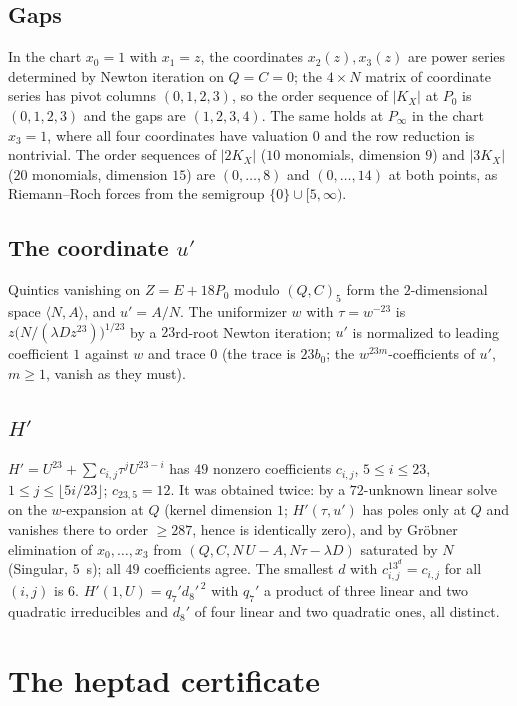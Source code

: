 \documentclass[11pt]{amsart}
\theoremstyle{plain}
\theoremstyle{definition}
\begin{document}
\subsection*{Gaps}
In the chart $x_0=1$ with $x_1=z$, the coordinates $x_2(z),x_3(z)$ are
power series determined by Newton iteration on $Q=C=0$; the $4\times N$
matrix of coordinate series has pivot columns $(0,1,2,3)$, so the order
sequence of $|K_X|$ at $P_0$ is $(0,1,2,3)$ and the gaps are
$(1,2,3,4)$. The same holds at $P_\infty$ in the chart $x_3=1$, where
all four coordinates have valuation $0$ and the row reduction is
nontrivial. The order sequences of $|2K_X|$ ($10$ monomials, dimension
$9$) and $|3K_X|$ ($20$ monomials, dimension $15$) are $(0,\dots,8)$
and $(0,\dots,14)$ at both points, as Riemann--Roch forces from the
semigroup $\{0\}\cup[5,\infty)$.

\subsection*{The coordinate $u'$}
Quintics vanishing on $Z=E+18P_0$ modulo $(Q,C)_5$ form the
$2$-dimensional space $\langle N,A\rangle$, and $u'=A/N$. The
uniformizer $w$ with $\tau=w^{-23}$ is
$z\bigl(N/(\lambda Dz^{23})\bigr)^{1/23}$ by a $23$rd-root Newton
iteration; $u'$ is normalized to leading coefficient $1$ against $w$
and trace $0$ (the trace is $23b_0$; the $w^{23m}$-coefficients of
$u'$, $m\ge1$, vanish as they must).

\subsection*{$H'$}
$H'=U^{23}+\sum c_{i,j}\tau^jU^{23-i}$ has $49$ nonzero coefficients
$c_{i,j}$, $5\le i\le23$, $1\le j\le\lfloor5i/23\rfloor$; $c_{23,5}=12$.
It was obtained twice: by a $72$-unknown linear solve on the
$w$-expansion at $Q$ (kernel dimension $1$; $H'(\tau,u')$ has poles
only at $Q$ and vanishes there to order $\ge287$, hence is identically
zero), and by Gr\"obner elimination of $x_0,\dots,x_3$ from
$(Q,C,N\,U-A,N\tau-\lambda D)$ saturated by $N$ (Singular, $5$~s); all
$49$ coefficients agree. The smallest $d$ with
$c_{i,j}^{13^d}=c_{i,j}$ for all $(i,j)$ is $6$.
$H'(1,U)=q_7'd_8'^{\,2}$ with $q_7'$ a product of three linear and two
quadratic irreducibles and $d_8'$ of four linear and two quadratic
ones, all distinct.

\section{The heptad certificate}\label{app:heptad}
\end{document}
